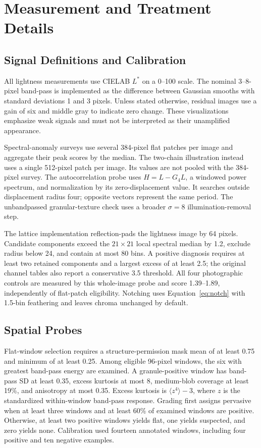 \documentclass[sigplan,10pt,nonacm]{acmart}
\newif\ifincludeappendix
\begin{document}



\ifincludeappendix
\clearpage
\appendix
\raggedbottom
\section{Measurement and Treatment Details}
\label{app:measurement}
\subsection{Signal Definitions and Calibration}
All lightness measurements use CIELAB $L^*$ on a 0--100 scale. The nominal 3--8-pixel band-pass is implemented as the difference between Gaussian smooths with standard deviations 1 and 3 pixels. Unless stated otherwise, residual images use a gain of six and middle gray to indicate zero change. These visualizations emphasize weak signals and must not be interpreted as their unamplified appearance.

Spectral-anomaly surveys use several 384-pixel flat patches per image and aggregate their peak scores by the median. The two-chain illustration instead uses a single 512-pixel patch per image. Its values are not pooled with the 384-pixel survey. The autocorrelation probe uses $H=L-G_4L$, a windowed power spectrum, and normalization by its zero-displacement value. It searches outside displacement radius four; opposite vectors represent the same period. The unbandpassed granular-texture check uses a broader $\sigma=8$ illumination-removal step.

The lattice implementation reflection-pads the lightness image by 64 pixels. Candidate components exceed the $21\times21$ local spectral median by 1.2, exclude radius below 24, and contain at most 80 bins. A positive diagnosis requires at least two retained components and a largest excess of at least 2.5; the original channel tables also report a conservative 3.5 threshold. All four photographic controls are measured by this whole-image probe and score 1.39--1.89, independently of flat-patch eligibility. Notching uses Equation~\ref{eq:notch} with 1.5-bin feathering and leaves chroma unchanged by default.

\subsection{Spatial Probes}
Flat-window selection requires a structure-permission mask mean of at least 0.75 and minimum of at least 0.25. Among eligible 96-pixel windows, the six with greatest band-pass energy are examined. A granule-positive window has band-pass SD at least 0.35, excess kurtosis at most 8, medium-blob coverage at least 19\%, and anisotropy at most 0.35. Excess kurtosis is $\langle z^4\rangle-3$, where $z$ is the standardized within-window band-pass response. Grading first assigns pervasive when at least three windows and at least 60\% of examined windows are positive. Otherwise, at least two positive windows yields flat, one yields suspected, and zero yields none. Calibration used fourteen annotated windows, including four positive and ten negative examples.
\end{document}
